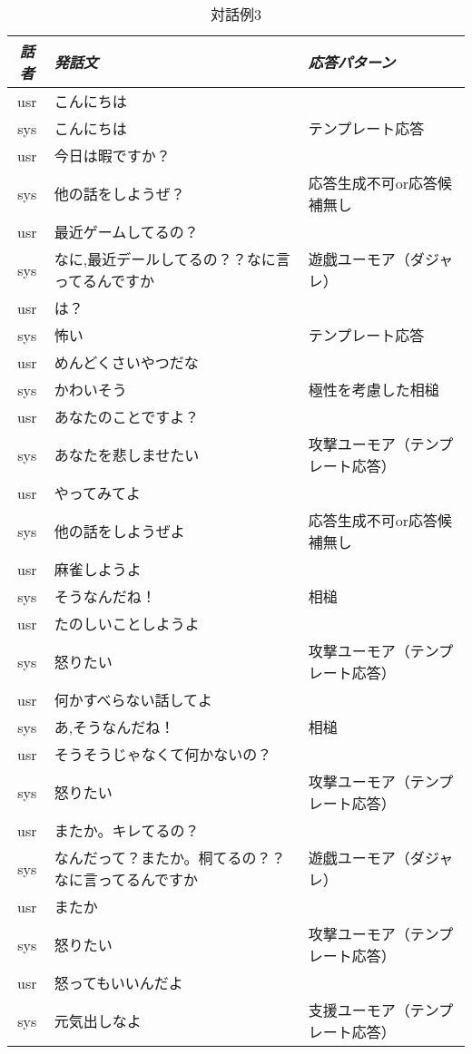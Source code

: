 \begin{longtable}{| c | p{} | p{}|}
\caption{対話例3}
\endhead
\hline
{\em 話者} & {\em 発話文} & {\em 応答パターン}\\
\hline
\hline
usr & こんにちは & \\
sys & こんにちは & テンプレート応答\\
usr & 今日は暇ですか？ & \\
sys & 他の話をしようぜ？ & 応答生成不可or応答候補無し\\
usr & 最近ゲームしてるの？ & \\
sys & なに,最近デールしてるの？？なに言ってるんですか & 遊戯ユーモア（ダジャレ）\\
usr & は？ & \\
sys & 怖い & テンプレート応答\\
usr & めんどくさいやつだな & \\
sys & かわいそう & 極性を考慮した相槌\\
usr & あなたのことですよ？ & \\
sys & あなたを悲しませたい & 攻撃ユーモア（テンプレート応答）\\
usr & やってみてよ & \\
sys & 他の話をしようぜよ & 応答生成不可or応答候補無し\\
usr & 麻雀しようよ & \\
sys & そうなんだね！ & 相槌\\
usr & たのしいことしようよ & \\
sys & 怒りたい & 攻撃ユーモア（テンプレート応答）\\
usr & 何かすべらない話してよ & \\
sys & あ,そうなんだね！ & 相槌\\
usr & そうそうじゃなくて何かないの？ & \\
sys & 怒りたい & 攻撃ユーモア（テンプレート応答）\\
usr & またか。キレてるの？ & \\
sys & なんだって？またか。桐てるの？？なに言ってるんですか & 遊戯ユーモア（ダジャレ）\\
usr & またか & \\
sys & 怒りたい & 攻撃ユーモア（テンプレート応答）\\
usr & 怒ってもいいんだよ & \\
sys & 元気出しなよ & 支援ユーモア（テンプレート応答）\\

\end{longtable}
